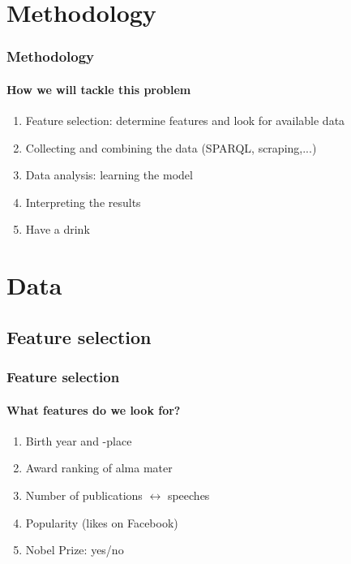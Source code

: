 \documentclass[nonav,sleutel]{beamer}
\begin{document}
\section{Methodology}
\begin{frame}
\frametitle{Methodology}
\framesubtitle{How we will tackle this problem}
\begin{enumerate}
\item<1-> Feature selection: determine features and look for available data
\item<2-> Collecting and combining the data (SPARQL, scraping,...)
\item<3-> Data analysis: learning the model
\item<4-> Interpreting the results
\item<5-> Have a drink
\end{enumerate}
\end{frame}

\section{Data}

\subsection{Feature selection}
\begin{frame}
\frametitle{Feature selection}
\framesubtitle{What features do we look for?}

\begin{enumerate}
\item<1-> Birth year and -place
\item<2-> Award ranking of alma mater
\item<3-> Number of publications $\leftrightarrow$ speeches
\item<4-> Popularity (likes on Facebook)
\item<5-> Nobel Prize: yes/no
\end{enumerate}

\end{frame}
\end{document}
